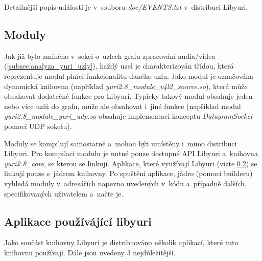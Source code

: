 \documentclass[thesis=M,czech]{FITthesis}[2012/06/26]
\begin{document}
Detailnější popis událostí je v~souboru \textit{doc/EVENTS.txt} v~distribuci Libyuri.
	
\subsection{Moduly} \label{subsec:analyza_yuri_moduly}
Jak již bylo zmíněno v~sekci o~uzlech grafu zpracování audia/videa (\ref{subsec:analyza_yuri_uzly}), každý uzel je charakterizován třídou, která reprezentuje modul plnící funkcionalitu daného uzlu. Jako modul je označována dynamická knihovna (například \textit{yuri2.8\_module\_v4l2\_source.so}), která může obsahovat dodatečné funkce pro Libyuri. Typicky takový modul obsahuje jeden nebo více uzlů do grafu, může ale obsahovat i~jiné funkce (například modul \textit{yuri2.8\_module\_yuri\_udp.so} obsahuje implementaci konceptu \textit{DatagramSocket} pomocí UDP soketu). 

Moduly se kompilují samostatně a~mohou být umístěny i~mimo distribuci Libyuri. Pro kompilaci modulu je nutné pouze dostupné API Libyuri a~knihovna \textit{yuri2.8\_core}, se kterou se linkují. Aplikace, které využívají Libyuri (vizte \ref{subsec:analyza_yuri_aplikace}) se linkují pouze s~jádrem knihovny. Po spuštění aplikace, jádro (pomocí builderu) vyhledá moduly v~adresářích napevno uvedených v~kódu a~případně dalších, specifikovaných uživatelem a~načte je.

\subsection{Aplikace používájící libyuri} \label{subsec:analyza_yuri_aplikace}
Jako součást knihovny Libyuri je distribuováno několik aplikací, které tuto knihovnu používají. Dále jsou uvedeny 3 nejdůležitější.\\
\end{document}
